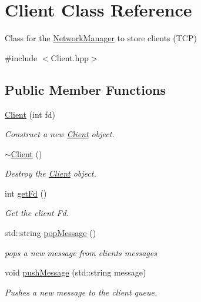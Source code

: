 \hypertarget{classClient}{}\section{Client Class Reference}
\label{classClient}


Class for the \mbox{\hyperlink{classNetworkManager}{Network\+Manager}} to store clients (T\+CP)  




{\ttfamily \#include $<$Client.\+hpp$>$}

\subsection*{Public Member Functions}
\begin{DoxyCompactItemize}
\item 
\mbox{\hyperlink{classClient_af0ffba7d73ea07f7610d6b1a98fbc561}{Client}} (int fd)
\begin{DoxyCompactList}\small\item\em Construct a new \mbox{\hyperlink{classClient}{Client}} object. \end{DoxyCompactList}\item 
\mbox{\hyperlink{classClient_a840e519ca781888cbd54181572ebe3a7}{$\sim$\+Client}} ()
\begin{DoxyCompactList}\small\item\em Destroy the \mbox{\hyperlink{classClient}{Client}} object. \end{DoxyCompactList}\item 
int \mbox{\hyperlink{classClient_a0e8dd592f774d92c9f6e7ef17b979baa}{get\+Fd}} ()
\begin{DoxyCompactList}\small\item\em Get the client Fd. \end{DoxyCompactList}\item 
std\+::string \mbox{\hyperlink{classClient_a4cbcf36b6641429d4b43788df6025f87}{pop\+Message}} ()
\begin{DoxyCompactList}\small\item\em pops a new message from clients messages \end{DoxyCompactList}\item 
void \mbox{\hyperlink{classClient_afa89bea9abcfcd83ba7fded09577fbbb}{push\+Message}} (std\+::string message)
\begin{DoxyCompactList}\small\item\em Pushes a new message to the client queue. \end{DoxyCompactList}\end{DoxyCompactItemize}
